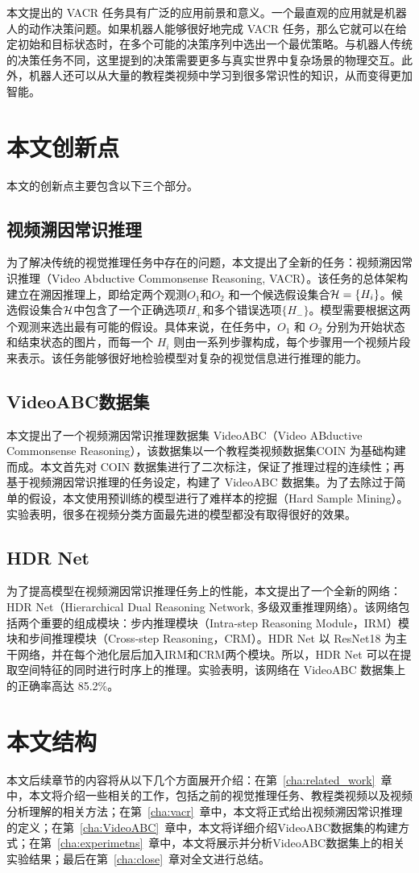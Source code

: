 本文提出的 VACR 任务具有广泛的应用前景和意义。一个最直观的应用就是机器人的动作决策问题。如果机器人能够很好地完成 VACR 任务，那么它就可以在给定初始和目标状态时，在多个可能的决策序列中选出一个最优策略。与机器人传统的决策任务不同，这里提到的决策需要更多与真实世界中复杂场景的物理交互。此外，机器人还可以从大量的教程类视频中学习到很多常识性的知识，从而变得更加智能。

\section{本文创新点}
本文的创新点主要包含以下三个部分。
\subsection{视频溯因常识推理}
为了解决传统的视觉推理任务中存在的问题，本文提出了全新的任务：视频溯因常识推理（Video Abductive Commonsense Reasoning, VACR）。该任务的总体架构建立在溯因推理上，即给定两个观测$O_1$和$O_2$ 和一个候选假设集合${\mathcal{H}} = \{H_i\}$。候选假设集合${\mathcal{H}}$中包含了一个正确选项$H_+$和多个错误选项$\{H_-\}$。模型需要根据这两个观测来选出最有可能的假设。具体来说，在\VACR 任务中，$O_1$ 和 $O_2$ 分别为开始状态和结束状态的图片，而每一个 $H_i$ 则由一系列步骤构成，每个步骤用一个视频片段来表示。该任务能够很好地检验模型对复杂的视觉信息进行推理的能力。
\subsection{VideoABC数据集}
本文提出了一个视频溯因常识推理数据集 VideoABC（Video ABductive Commonsense Reasoning），该数据集以一个教程类视频数据集COIN\cite{tang2019coin} 为基础构建而成。本文首先对 COIN 数据集进行了二次标注，保证了推理过程的连续性；再基于视频溯因常识推理的任务设定，构建了 VideoABC 数据集。为了去除过于简单的假设，本文使用预训练的模型进行了难样本的挖掘（Hard Sample Mining）。实验表明，很多在视频分类方面最先进的模型都没有取得很好的效果\cite{tran2018closer,wang2016temporal,carreira2017quo}。
\subsection{HDR Net}
为了提高模型在视频溯因常识推理任务上的性能，本文提出了一个全新的网络： HDR Net（Hierarchical Dual Reasoning Network, 多级双重推理网络）。该网络包括两个重要的组成模块：步内推理模块（Intra-step Reasoning Module，IRM）模块和步间推理模块（Cross-step Reasoning，CRM）。HDR Net 以 ResNet18\cite{he2016deep} 为主干网络，并在每个池化层后加入IRM和CRM两个模块。所以，HDR Net 可以在提取空间特征的同时进行时序上的推理。实验表明，该网络在 VideoABC 数据集上的正确率高达 85.2\%。

\section{本文结构}
本文后续章节的内容将从以下几个方面展开介绍：在第~\ref{cha:related_work}~章中，本文将介绍一些相关的工作，包括之前的视觉推理任务、教程类视频以及视频分析理解的相关方法；在第~\ref{cha:vacr}~章中，本文将正式给出视频溯因常识推理的定义；在第~\ref{cha:VideoABC}~章中，本文将详细介绍VideoABC数据集的构建方式；在第~\ref{cha:experimetns}~章中，本文将展示并分析VideoABC数据集上的相关实验结果；最后在第~\ref{cha:close}~章对全文进行总结。